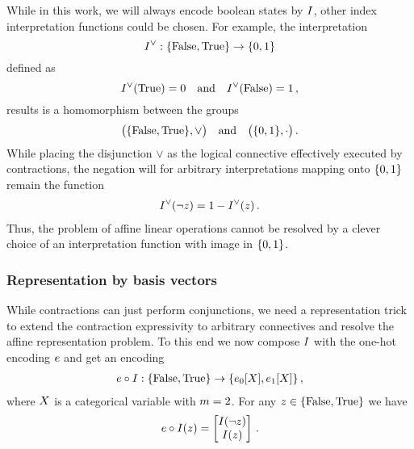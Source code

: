 While in this work, we will always encode boolean states by $I$, other index interpretation functions could be chosen.
For example, the interpretation
	\[ I^{\lor}:\{\mathrm{False},\mathrm{True}\}\rightarrow\{0,1\} \]
defined as
    	\[ I^{\lor}(\mathrm{True}) = 0 \quad \text{and} \quad I^{\lor}(\mathrm{False}) = 1 \, , \]
results is a homomorphism between the groups	
	\[ \big(\{\mathrm{False},\mathrm{True}\},\lor\big) \quad \text{and} \quad \big(\{0,1\},\cdot\big) \, . \]
While placing the disjunction $\lor$ as the logical connective effectively executed by contractions, the negation will for arbitrary interpretations mapping onto $\{0,1\}$ remain the function %
\begin{align*}
 	I^{\lor}(\lnot z) = 1 - I^{\lor}(z)  \, . 
\end{align*}
Thus, the problem of affine linear operations cannot be resolved by a clever choice of an interpretation function with image in $\{0,1\}$. 


\subsubsection{Representation by basis vectors} %

While contractions can just perform conjunctions, we need a representation trick to extend the contraction expressivity to arbitrary connectives and resolve the affine representation problem.
To this end we now compose $I$ with the one-hot encoding $e$ and get an encoding
\begin{align*}
	e\circ I : \{\mathrm{False},\mathrm{True}\} \rightarrow \{e_0[X],e_1[X]\} \, ,
\end{align*}
where $X$ is a categorical variable with $m=2$.
For any $z\in\{\mathrm{False},\mathrm{True}\}$ we have
\begin{align*}
	e\circ I(z) = 
	\begin{bmatrix}
		I(\lnot z) \\
		I(z)
	\end{bmatrix}  \, .
\end{align*}



